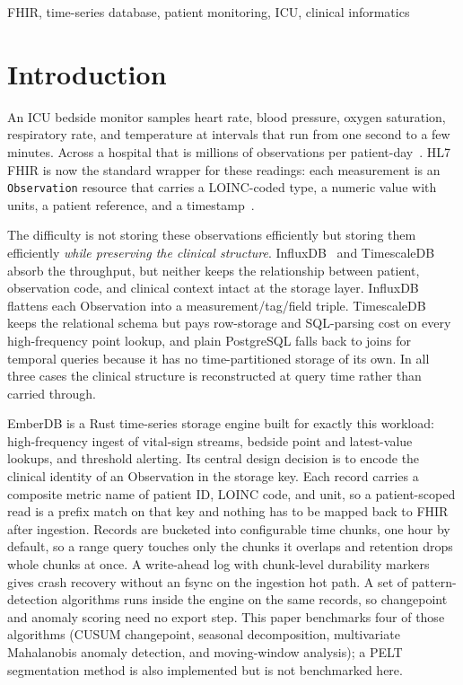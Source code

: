 \documentclass[journal]{IEEEtran}
\begin{document}
\begin{IEEEkeywords}
FHIR, time-series database, patient monitoring, ICU, clinical informatics
\end{IEEEkeywords}

\section{Introduction}
\label{sec:intro}

An ICU bedside monitor samples heart rate, blood pressure, oxygen saturation, respiratory rate, and temperature at intervals that run from one second to a few minutes. Across a hospital that is millions of observations per patient-day~\cite{johnson2016mimic}. HL7 FHIR is now the standard wrapper for these readings: each measurement is an \texttt{Observation} resource that carries a LOINC-coded type, a numeric value with units, a patient reference, and a timestamp~\cite{hl7fhir}.

The difficulty is not storing these observations efficiently but storing them efficiently \emph{while preserving the clinical structure}. InfluxDB~\cite{influxdb} and TimescaleDB~\cite{timescaledb} absorb the throughput, but neither keeps the relationship between patient, observation code, and clinical context intact at the storage layer. InfluxDB flattens each Observation into a measurement/tag/field triple. TimescaleDB keeps the relational schema but pays row-storage and SQL-parsing cost on every high-frequency point lookup, and plain PostgreSQL falls back to joins for temporal queries because it has no time-partitioned storage of its own. In all three cases the clinical structure is reconstructed at query time rather than carried through.

EmberDB is a Rust time-series storage engine built for exactly this workload: high-frequency ingest of vital-sign streams, bedside point and latest-value lookups, and threshold alerting. Its central design decision is to encode the clinical identity of an Observation in the storage key. Each record carries a composite metric name of patient ID, LOINC code, and unit, so a patient-scoped read is a prefix match on that key and nothing has to be mapped back to FHIR after ingestion. Records are bucketed into configurable time chunks, one hour by default, so a range query touches only the chunks it overlaps and retention drops whole chunks at once. A write-ahead log with chunk-level durability markers gives crash recovery without an fsync on the ingestion hot path. A set of pattern-detection algorithms runs inside the engine on the same records, so changepoint and anomaly scoring need no export step. This paper benchmarks four of those algorithms (CUSUM changepoint, seasonal decomposition, multivariate Mahalanobis anomaly detection, and moving-window analysis); a PELT segmentation method is also implemented but is not benchmarked here.
\end{document}
